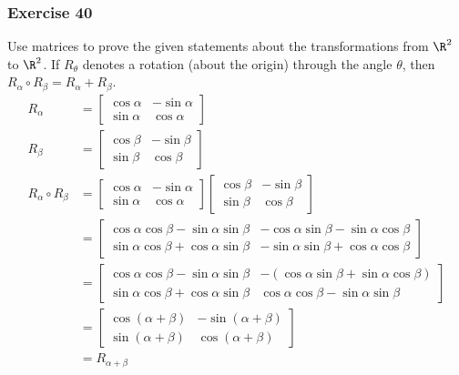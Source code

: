\documentclass{math}
\begin{document}
\subsubsection*{Exercise 40}
Use matrices to prove the given statements about the transformations from
\( \R^2 \) to \( \R^2 \). If \( R_{\theta} \) denotes a rotation (about the
origin) through the angle \( \theta \), then \( R_{\alpha}\circ R_{\beta} =
R_{\alpha}+R_{\beta} \).
\begin{align*}
  R_{\alpha} &= \begin{bmatrix}
    \cos\alpha & -\sin\alpha \\
    \sin\alpha & \cos\alpha
  \end{bmatrix} \\
  R_{\beta} &= \begin{bmatrix}
    \cos\beta & -\sin\beta \\
    \sin\beta & \cos\beta
  \end{bmatrix} \\
  R_{\alpha}\circ R_{\beta} &= \begin{bmatrix}
    \cos\alpha & -\sin\alpha \\
    \sin\alpha & \cos\alpha
  \end{bmatrix}\begin{bmatrix}
    \cos\beta & -\sin\beta \\
    \sin\beta & \cos\beta
  \end{bmatrix} \\
  &= \begin{bmatrix}
    \cos\alpha\cos\beta-\sin\alpha\sin\beta &
      -\cos\alpha\sin\beta-\sin\alpha\cos\beta \\
    \sin\alpha\cos\beta+\cos\alpha\sin\beta &
      -\sin\alpha\sin\beta+\cos\alpha\cos\beta
  \end{bmatrix} \\
  &= \begin{bmatrix}
    \cos\alpha\cos\beta-\sin\alpha\sin\beta &
      -(\cos\alpha\sin\beta+\sin\alpha\cos\beta) \\
    \sin\alpha\cos\beta+\cos\alpha\sin\beta &
      \cos\alpha\cos\beta-\sin\alpha\sin\beta
  \end{bmatrix} \\
  &= \begin{bmatrix}
    \cos(\alpha+\beta) & -\sin(\alpha+\beta) \\
    \sin(\alpha+\beta) & \cos(\alpha+\beta)
  \end{bmatrix} \\
  &= R_{\alpha+\beta}
\end{align*}
\end{document}
